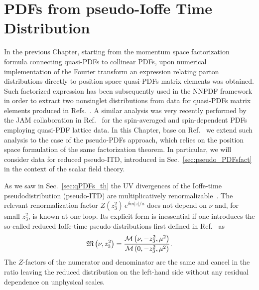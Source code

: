 \chapter{PDFs from pseudo-Ioffe Time Distribution}
In the previous Chapter, 
starting from the momentum space factorization formula connecting quasi-PDFs to collinear PDFs,
upon numerical implementation of the Fourier transform an expression relating
parton distributions directly to position space quasi-PDFs matrix elements
was obtained. Such factorized expression has been subsequently used in the NNPDF framework in order to 
extract two nonsinglet distributions from data for quasi-PDFs matrix elements 
produced in Refs.~\cite{Alexandrou:2018pbm, Alexandrou:2019lfo}.
A similar analysis was very recently performed by the JAM collaboration in Ref.~\cite{Bringewatt:2020ixn} 
for the spin-averaged and spin-dependent PDFs employing quasi-PDF lattice data.  
In this Chapter, base on Ref.~\cite{DelDebbio:2020rgv} we extend such analysis to the case of the pseudo-PDFs approach,
which relies on the position space formulation of the same factorization theorem. 
In particular, we will consider data for reduced pseudo-ITD, introduced in Sec.~\ref{sec:pseudo_PDFsfact}
in the context of the scalar field theory.

%
As we saw in Sec.~\ref{sec:qPDFs_th} the UV divergences of the Ioffe-time pseudodistribution (pseudo-ITD)
are multiplicatively renormalizable~\cite{Ji:2017oey,Ishikawa:2017faj}. 
The relevant renormalization factor $Z(z_3^2)\,e^{\delta m |z|/a}$ does not depend on $\nu$ and, 
for small $z_3^2$,   is known at one loop. 
Its explicit form is inessential if one introduces the so-called reduced 
Ioffe-time pseudo-distributions first defined in Ref.~\cite{Radyushkin:2017cyf}
as 
\begin{align}
	\label{eq:reducedIoffe}
	\mathfrak{M}\left(\nu, z_3^2\right) = \frac{\mathcal{M}\left( \nu,-z_3^2, \mu^2 \right)}{\mathcal{M}\left( 0,-z_3^2, \mu^2 \right)}. 
\end{align}
The $Z$-factors of the numerator and denominator are the same and cancel in the ratio leaving the reduced distribution
on the left-hand side without any residual dependence on 
unphysical scales. 



